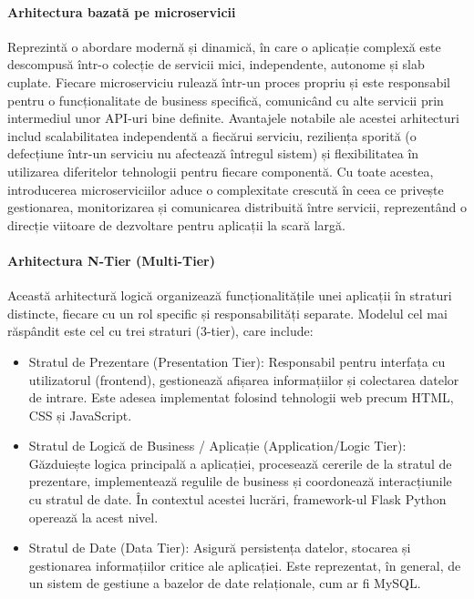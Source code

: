 \documentclass[12pt, a4paper, oneside, romanian]{teza-upb}
\begin{document}
	\paragraph{Arhitectura bazată pe microservicii}
	Reprezintă o abordare modernă și dinamică, în care o aplicație complexă este descompusă într-o colecție de servicii mici, independente, autonome și slab cuplate. Fiecare microserviciu rulează într-un proces propriu și este responsabil pentru o funcționalitate de business specifică, comunicând cu alte servicii prin intermediul unor API-uri bine definite. Avantajele notabile ale acestei arhitecturi includ scalabilitatea independentă a fiecărui serviciu, reziliența sporită (o defecțiune într-un serviciu nu afectează întregul sistem) și flexibilitatea în utilizarea diferitelor tehnologii pentru fiecare componentă. Cu toate acestea, introducerea microserviciilor aduce o complexitate crescută în ceea ce privește gestionarea, monitorizarea și comunicarea distribuită între servicii, reprezentând o direcție viitoare de dezvoltare pentru aplicații la scară largă.
	
	
	\paragraph{Arhitectura N-Tier (Multi-Tier)}
	Această arhitectură logică \cite{n} organizează funcționalitățile unei aplicații în straturi distincte, fiecare cu un rol specific și responsabilități separate. Modelul cel mai răspândit este cel cu trei straturi (3-tier), care include:
	\begin{itemize}
		\item Stratul de Prezentare (Presentation Tier): Responsabil pentru interfața cu utilizatorul (frontend), gestionează afișarea informațiilor și colectarea datelor de intrare. Este adesea implementat folosind tehnologii web precum HTML, CSS și JavaScript.
		\item Stratul de Logică de Business / Aplicație (Application/Logic Tier): Găzduiește logica principală a aplicației, procesează cererile de la stratul de prezentare, implementează regulile de business și coordonează interacțiunile cu stratul de date. În contextul acestei lucrări, framework-ul Flask Python operează la acest nivel.
		\item Stratul de Date (Data Tier): Asigură persistența datelor, stocarea și gestionarea informațiilor critice ale aplicației. Este reprezentat, în general, de un sistem de gestiune a bazelor de date relaționale, cum ar fi MySQL.
	\end{itemize}
	
\end{document}
